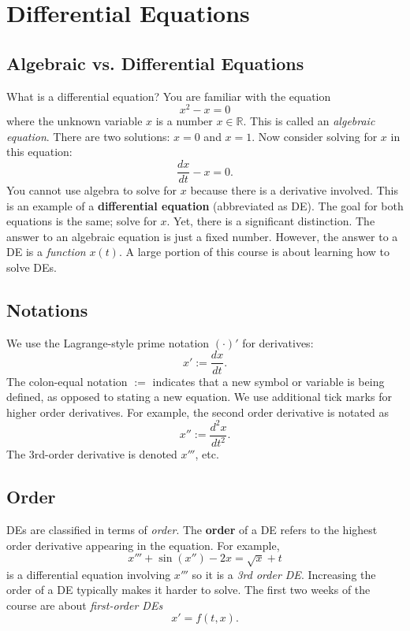 \documentclass[letterpaper]{article}
\begin{document}

\section{Differential Equations}

\subsection{Algebraic vs. Differential Equations}
What is a differential equation? You are familiar with the equation
    \[x^2-x=0\] 
where the unknown variable $x$ is a number $x\in\mathbb{R}$. This is called an \textit{algebraic equation}. There are two solutions: $x=0$ and $x=1$. Now consider solving for $x$ in this equation:
  \[ \frac{dx}{dt} - x = 0.\]
You cannot use algebra to solve for $x$ because there is a derivative involved. This is an example of a \textbf{differential equation} (abbreviated as DE). The goal for both equations is the same; solve for $x$. Yet, there is a significant distinction. The answer to an algebraic equation is just a fixed number. However, the answer to a DE is a \textit{function} $x(t)$. A large portion of this course is about learning how to solve DEs.

\subsection{Notations}
We use the Lagrange-style prime notation $(\cdot)'$ for derivatives:
\[
    x' := \frac{dx}{dt}. 
\]
The colon-equal notation $:=$ indicates that a new symbol or variable is being defined, as opposed to stating a new equation. We use additional tick marks for higher order derivatives. For example, the second order derivative is notated as
\[
    x'' := \frac{d^2x}{dt^2}.
\]
The 3rd-order derivative is denoted $x'''$, etc. 

\subsection{Order}
DEs are classified in terms of \textit{order}. The \textbf{order} of a DE refers to the highest order derivative appearing in the equation.
For example, 
\[
    x'''+\sin(x'') - 2x = \sqrt{x} +t 
\]
is a differential equation involving $x'''$ so it is a \textit{3rd order DE}. Increasing the order of a DE typically makes it harder to solve. The first two weeks of the course are about \textit{first-order DEs} 
\[
x' = f(t,x).
\]
\end{document}

